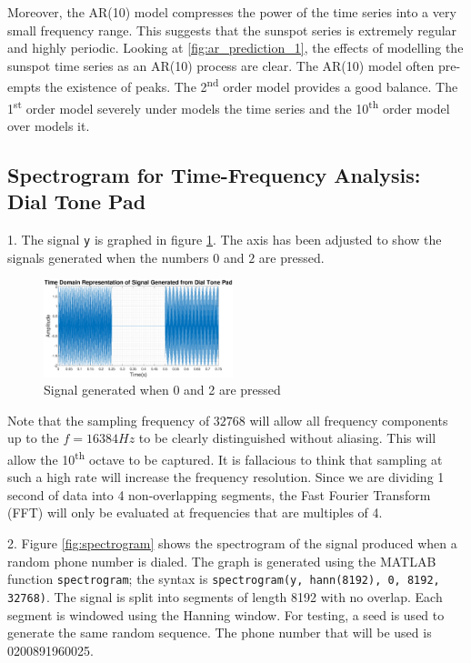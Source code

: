 \documentclass{article}
\begin{document}
Moreover, the AR(10) model compresses the power of the time series into a very small frequency range. This suggests that the sunspot series is extremely regular and highly periodic. Looking at \ref{fig:ar_prediction_1}, the effects of modelling the sunspot time series as an AR(10) process are clear. The AR(10) model often pre-empts the existence of peaks. The 2\textsuperscript{nd} order model provides a good balance. The 1\textsuperscript{st} order model severely under models the time series and the 10\textsuperscript{th} order model over models it. 

\newpage
\subsection{Spectrogram for Time-Frequency Analysis: Dial Tone Pad}

1. The signal {\tt y} is graphed in figure \ref{fig:phone_num}. The axis has been adjusted to show the signals generated when the numbers $0$ and $2$ are pressed. 

\begin{figure}[H]
    \centering
    \includegraphics[width=0.49\textwidth]{phone_num}
    \caption{Signal generated when 0 and 2 are pressed}
    \label{fig:phone_num}
\end{figure}

Note that the sampling frequency of $32768$ will allow all frequency components up to the $f=16384Hz$ to be clearly distinguished without aliasing. This will allow the 10\textsuperscript{th} octave to be captured. It is fallacious to think that sampling at such a high rate will increase the frequency resolution. Since we are dividing 1 second of data into 4 non-overlapping segments, the Fast Fourier Transform (FFT) will only be evaluated at frequencies that are multiples of 4.


2. Figure \ref{fig:spectrogram} shows the spectrogram of the signal produced when a random phone number is dialed. The graph is generated using the MATLAB function {\tt spectrogram}; the syntax is {\tt spectrogram(y, hann(8192), 0, 8192, 32768)}. The signal is split into segments of length 8192 with no overlap. Each segment is windowed using the Hanning window. For testing, a seed is used to generate the same random sequence. The phone number that will be used is 0200891960025. 
\end{document}
